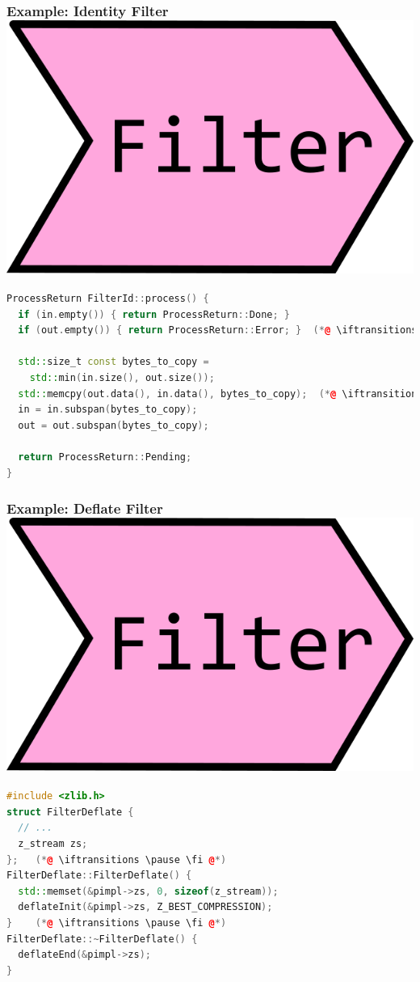 \documentclass[aspectratio=169]{beamer}
\newif\iftransitions
\begin{document}
\begin{frame}[fragile]
  \frametitle{Example: Identity Filter \hspace{230pt} \includegraphics[height=.1\textheight]{pipelinesgfx/filter.png}}
\iftransitions \pause \fi
  \begin{lstlisting}[language={C++}]
ProcessReturn FilterId::process() {
  if (in.empty()) { return ProcessReturn::Done; }
  if (out.empty()) { return ProcessReturn::Error; }  (*@ \iftransitions \pause \fi @*)

  std::size_t const bytes_to_copy =
    std::min(in.size(), out.size());
  std::memcpy(out.data(), in.data(), bytes_to_copy);  (*@ \iftransitions \pause \fi @*)
  in = in.subspan(bytes_to_copy);
  out = out.subspan(bytes_to_copy);

  return ProcessReturn::Pending;
}
  \end{lstlisting}
\end{frame}

\begin{frame}[fragile]
  \frametitle{Example: Deflate Filter \hspace{233pt} \includegraphics[height=.1\textheight]{pipelinesgfx/filter.png}}
  
  \begin{lstlisting}[language={C++}]
#include <zlib.h>
struct FilterDeflate {
  // ...
  z_stream zs;
};   (*@ \iftransitions \pause \fi @*)
FilterDeflate::FilterDeflate() {
  std::memset(&pimpl->zs, 0, sizeof(z_stream));
  deflateInit(&pimpl->zs, Z_BEST_COMPRESSION);
}    (*@ \iftransitions \pause \fi @*)
FilterDeflate::~FilterDeflate() {
  deflateEnd(&pimpl->zs);
}
  \end{lstlisting}
\end{frame}
\end{document}
